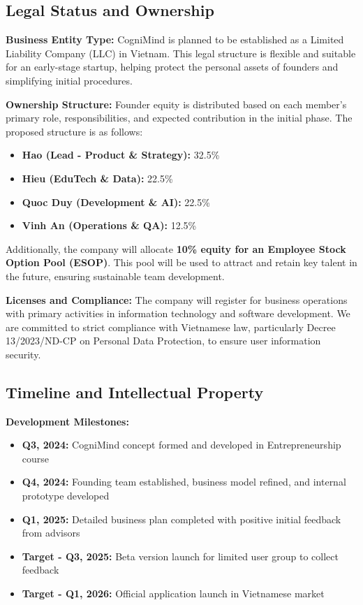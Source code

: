 \subsection{Legal Status and Ownership}

\textbf{Business Entity Type:}
CogniMind is planned to be established as a Limited Liability Company (LLC) in Vietnam. This legal structure is flexible
and suitable for an early-stage startup, helping protect the personal assets of founders and simplifying initial procedures.

\textbf{Ownership Structure:}
Founder equity is distributed based on each member's primary role, responsibilities, and expected contribution in the
initial phase. The proposed structure is as follows:

\begin{itemize}
    \item \textbf{Hao (Lead - Product \& Strategy):} 32.5\%
    \item \textbf{Hieu (EduTech \& Data):} 22.5\%
    \item \textbf{Quoc Duy (Development \& AI):} 22.5\%
    \item \textbf{Vinh An (Operations \& QA):} 12.5\%
\end{itemize}

Additionally, the company will allocate \textbf{10\% equity for an Employee Stock Option Pool (ESOP)}. This pool will be
used to attract and retain key talent in the future, ensuring sustainable team development.

\textbf{Licenses and Compliance:}
The company will register for business operations with primary activities in information technology and software
development. We are committed to strict compliance with Vietnamese law, particularly Decree 13/2023/ND-CP on Personal 
Data Protection, to ensure user information security.

\subsection{Timeline and Intellectual Property}

\textbf{Development Milestones:}
\begin{itemize}
    \item \textbf{Q3, 2024:} CogniMind concept formed and developed in Entrepreneurship course
    \item \textbf{Q4, 2024:} Founding team established, business model refined, and internal prototype developed
    \item \textbf{Q1, 2025:} Detailed business plan completed with positive initial feedback from advisors
    \item \textbf{Target - Q3, 2025:} Beta version launch for limited user group to collect feedback
    \item \textbf{Target - Q1, 2026:} Official application launch in Vietnamese market
\end{itemize}

